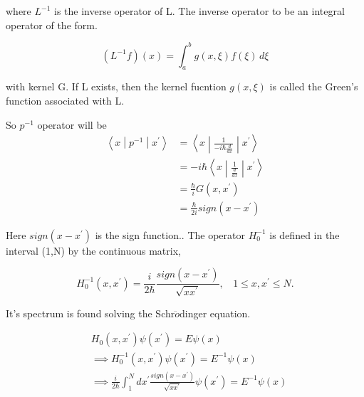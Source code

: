 \documentclass[12pt]{report}
\newcommand*{\1}{\hspace{1pt}}
\begin{document}
        where $L^{-1}$ is the inverse operator of L. The inverse operator to be an integral operator of the form.

        \begin{equation}
            \left(L^{-1}f\right)(x) = \int_{a}^{b} g(x,\xi ) f(\xi) \,d\xi 
        \end{equation}

        with kernel G. If L exists, then the kernel fucntion $g(x,\xi)$ is called the Green's function associated with L.

        So $p^{-1}$ operator will be
        \begin{equation}
            \begin{split}
                \left\langle x\middle|p^{-1}\middle|x^{'}\right\rangle &= \left\langle x\middle| \frac{1}{-i\hbar\frac{d}{dx}}\middle| x^{'}\right\rangle \\ 
                &= -i\hbar\left\langle x\middle| \frac{1}{\frac{d}{dx}}\middle| x^{'}\right\rangle \\
                &= \frac{\hbar}{i}G(x,x^{'}) \\ 
                &= \frac{\hbar}{2i} sign(x-x^{'})
            \end{split}
        \end{equation}

        Here $sign(x-x^{'})$ is the sign function.\cite{s10}. The operator $H_{0}^{-1}$ is defined in the interval (1,N) by the continuous matrix,

        \begin{equation}
            H_{0} ^{-1} (x,x^{'}) = \frac{i}{2\hbar} \frac{sign(x-x^{'})}{\sqrt{x x^{'}}},  \ \ \ \ 1\leqslant x , x^{'} \leqslant N.
        \end{equation}

        It's spectrum is found solving the Schr$\ddot{o}$dinger equation. 

        \begin{equation}
            \begin{split}
                &H_{0}(x,x^{'}) \psi(x^{'}) = E \psi(x) \\ 
                & \implies H_{0} ^{-1}(x,x^{'}) \psi(x^{'}) = E^{-1} \psi(x) \\ 
                & \implies \frac{i}{2\hbar} \int _{1}^{N} dx^{'}\frac{sign(x-x^{'})}{\sqrt{x x^{'}}} \psi(x^{'}) = E^{-1} \psi(x) \\ 
            \end{split}
        \end{equation}
\end{document}
